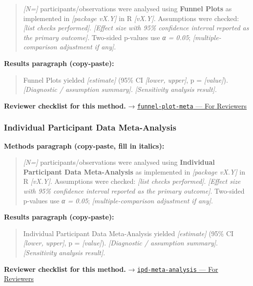 \documentclass[
]{article}
\begin{document}
\begin{quote}
\emph{{[}N={]}} participants/observations were analysed using
\textbf{Funnel Plots} as implemented in \emph{{[}package vX.Y{]}} in R
\emph{{[}vX.Y{]}}. Assumptions were checked: \emph{{[}list checks
performed{]}}. \emph{{[}Effect size with 95\% confidence interval
reported as the primary outcome{]}}. Two-sided p-values use \emph{α =
0.05}; \emph{{[}multiple-comparison adjustment if any{]}}.
\end{quote}

\textbf{Results paragraph (copy-paste):}

\begin{quote}
Funnel Plots yielded \emph{{[}estimate{]}} (95\% CI \emph{{[}lower,
upper{]}}, p = \emph{{[}value{]}}). \emph{{[}Diagnostic / assumption
summary{]}}. \emph{{[}Sensitivity analysis result{]}}.
\end{quote}

\textbf{Reviewer checklist for this method.} →
\href{../chapters/15-metaanalysis/funnel-plot-meta.Rmd\#for-reviewers}{\texttt{funnel-plot-meta}
--- For Reviewers}

\subsubsection{Individual Participant Data
Meta-Analysis}\label{individual-participant-data-meta-analysis}

\textbf{Methods paragraph (copy-paste, fill in italics):}

\begin{quote}
\emph{{[}N={]}} participants/observations were analysed using
\textbf{Individual Participant Data Meta-Analysis} as implemented in
\emph{{[}package vX.Y{]}} in R \emph{{[}vX.Y{]}}. Assumptions were
checked: \emph{{[}list checks performed{]}}. \emph{{[}Effect size with
95\% confidence interval reported as the primary outcome{]}}. Two-sided
p-values use \emph{α = 0.05}; \emph{{[}multiple-comparison adjustment if
any{]}}.
\end{quote}

\textbf{Results paragraph (copy-paste):}

\begin{quote}
Individual Participant Data Meta-Analysis yielded \emph{{[}estimate{]}}
(95\% CI \emph{{[}lower, upper{]}}, p = \emph{{[}value{]}}).
\emph{{[}Diagnostic / assumption summary{]}}. \emph{{[}Sensitivity
analysis result{]}}.
\end{quote}

\textbf{Reviewer checklist for this method.} →
\href{../chapters/15-metaanalysis/ipd-meta-analysis.Rmd\#for-reviewers}{\texttt{ipd-meta-analysis}
--- For Reviewers}
\end{document}
